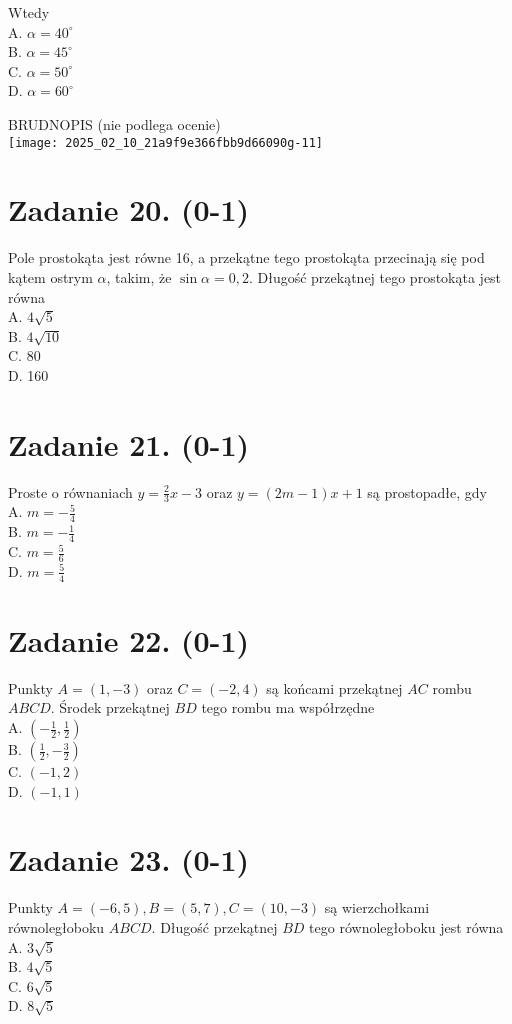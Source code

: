 \documentclass[10pt]{article}
\begin{document}
Wtedy\\
A. \(\alpha=40^{\circ}\)\\
B. \(\alpha=45^{\circ}\)\\
C. \(\alpha=50^{\circ}\)\\
D. \(\alpha=60^{\circ}\)

BRUDNOPIS (nie podlega ocenie)\\
\texttt{[image: 2025\_02\_10\_21a9f9e366fbb9d66090g-11]}

\section*{Zadanie 20. (0-1)}
Pole prostokąta jest równe 16, a przekątne tego prostokąta przecinają się pod kątem ostrym \(\alpha\), takim, że \(\sin \alpha=0,2\). Długość przekątnej tego prostokąta jest równa\\
A. \(4 \sqrt{5}\)\\
B. \(4 \sqrt{10}\)\\
C. 80\\
D. 160

\section*{Zadanie 21. (0-1)}
Proste o równaniach \(y=\frac{2}{3} x-3\) oraz \(y=(2 m-1) x+1\) są prostopadłe, gdy\\
A. \(m=-\frac{5}{4}\)\\
B. \(m=-\frac{1}{4}\)\\
C. \(m=\frac{5}{6}\)\\
D. \(m=\frac{5}{4}\)

\section*{Zadanie 22. (0-1)}
Punkty \(A=(1,-3)\) oraz \(C=(-2,4)\) są końcami przekątnej \(A C\) rombu \(A B C D\). Środek przekątnej \(B D\) tego rombu ma współrzędne\\
A. \(\left(-\frac{1}{2}, \frac{1}{2}\right)\)\\
B. \(\left(\frac{1}{2},-\frac{3}{2}\right)\)\\
C. \((-1,2)\)\\
D. \((-1,1)\)

\section*{Zadanie 23. (0-1)}
Punkty \(A=(-6,5), B=(5,7), C=(10,-3)\) są wierzchołkami równoległoboku \(A B C D\). Długość przekątnej \(B D\) tego równoległoboku jest równa\\
A. \(3 \sqrt{5}\)\\
B. \(4 \sqrt{5}\)\\
C. \(6 \sqrt{5}\)\\
D. \(8 \sqrt{5}\)
\end{document}

